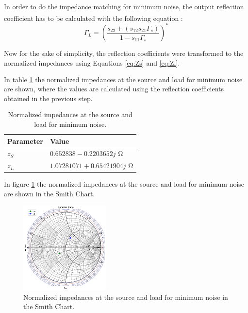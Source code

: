 In order to do the impedance matching for minimum noise, the output reflection coefficient has to be calculated with the following equation \textsuperscript{\cite{Slides}}:
\begin{equation}
    \Gamma_{L} = \left(\frac{s_{22}+(s_{12}s_{21}\Gamma_s)}{1-s_{11}\Gamma_s}\right)^*
    \label{eq:GammaL-noise}
\end{equation}

Now for the sake of simplicity, the reflection coefficients were transformed to the normalized impedances using Equations \ref{eq:Zs} and \ref{eq:Zl}.

In table \ref{tab: noise-impedances} the normalized impedances at the source and load for minimum noise are shown, where the values are calculated using the reflection coefficients obtained in the previous step.

\begin{table}[H]
    \centering
    \caption{Normalized impedances at the source and load for minimum noise.}
    \begin{tabularx}{\textwidth}{>{\centering\arraybackslash}X >{\centering\arraybackslash}X}
        \toprule
        \textbf{Parameter} & \textbf{Value} \\
        \midrule
        $z_{S}$     & $0.652838-0.2203652j$ \si{\ohm} \\
        \midrule
        $z_{L}$     & $1.07281071+0.65421904j$ \si{\ohm}\\
        \bottomrule
    \end{tabularx}
    \label{tab: noise-impedances}
\end{table}

In figure \ref{fig:ZsZl-noise} the normalized impedances at the source and load for minimum noise are shown in the Smith Chart.

\begin{figure}[H]
    \centering
    \includegraphics[width=0.4\textwidth]{Images/ZsZl-noise-smithChart.png}
    \caption{Normalized impedances at the source and load for minimum noise in the Smith Chart.}
    \label{fig:ZsZl-noise}
\end{figure}

